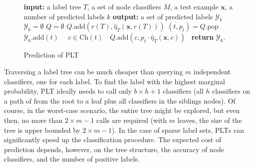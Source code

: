 \documentclass{article}
\newcommand{\Algo}[1]{\textsc{#1}}
\renewcommand{\vec}[1]{\boldsymbol{#1}}
\newcommand{\bx}{\vec{x}}
\newcommand{\by}{\vec{y}}
\newcommand{\calY}{\mathcal{Y}}
\newcommand{\heta}{\hat{\eta}}
\newcommand{\Children}[1]{\mathrm{Ch}(#1)}
\begin{document}

\begin{wrapfigure}{R}{0.55\textwidth}
\vspace{-0.6cm}
\begin{minipage}{0.5\textwidth}
\begin{algorithm}[H]
\caption{Prediction of \Algo{PLT}} %
\label{alg:pt-prediction}
\begin{algorithmic}[1]
\State \textbf{input:} a label tree $T$,  a set of node classifiers $M$, a test example $\bx$, a number of predicted labels $k$ 
\State \textbf{output:} a set of predicted labels $\calY_k$ 
\State $\calY_k = \emptyset$
\State $Q = \emptyset$ 
\State $Q.\mathrm{add}(r(T),\heta_T(\bx,r(T)))$ 
\While{$|\calY_k| < k$}
\State $(t,p_t) = Q.\mathrm{pop}$
 $\calY_k.\mathrm{add}(t)$ 
\Else \ \algorithmicfor\ $c \in \Children{t}$\ \algorithmicdo\ $Q.\mathrm{add}(c, p_t \cdot \heta_T(\bx,c))$\ 
\EndIf
\EndWhile
\State \textbf{return} $\calY_k$. 
\end{algorithmic}
\end{algorithm} 
\end{minipage}
\vspace{-0.6cm}
\end{wrapfigure}

Traversing a label tree can be much cheaper than querying $m$ independent classifiers, one for each label. To find the label with the highest marginal probability, \Algo{PLT} ideally needs to call only $b\times h+1$ classifiers (all $h$ classifiers on a path of from the root to a leaf plus all classifiers in the siblings nodes). Of course, in the worst-case scenario, the entire tree might be explored, but even then, no more than $2 \times m-1$ calls are required (with $m$ leaves, the size of the tree is upper bounded by $2 \times m-1$). In the case of sparse label sets, \Algo{PLT}s can significantly speed up the classification procedure. The expected cost of prediction depends, however, on the tree structure, the accuracy of node classifiers, and the number of positive labels.
\end{document}
